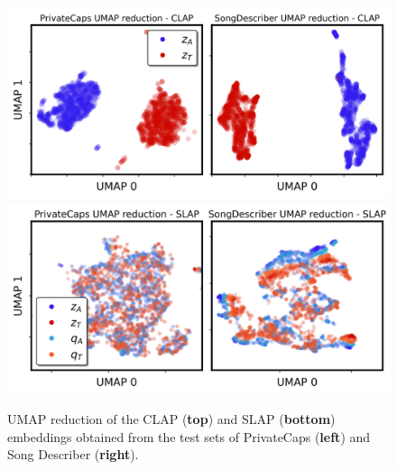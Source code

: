 \documentclass{article}
\begin{document}
\begin{table}[h]
\centering
{}
\caption{Best-of-four zero-shot classification and tagging results for genre and instrument classification, and automatic tagging. Best scores are shown in \textbf{bold}.} 
\label{tab:zero}
\end{table}

\begin{figure}[t]
    \centering
    \includegraphics[width=\linewidth]{figs/umapclap.png}
    \includegraphics[width=\linewidth]{figs/umapslap.png}
    \caption{
        UMAP reduction of the CLAP (\textbf{top}) and SLAP (\textbf{bottom}) embeddings obtained from the test sets of PrivateCaps (\textbf{left}) and Song Describer (\textbf{right}).
    }
    \label{fig:UMAPreductions}
\end{figure}
\end{document}
